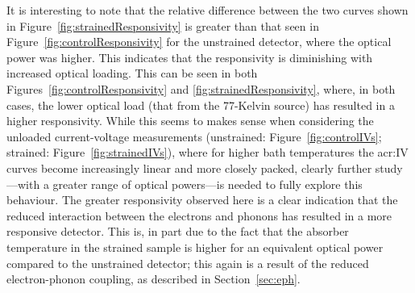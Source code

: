 \par 
It is interesting to note that the relative difference between the two curves shown in Figure~\ref{fig:strainedResponsivity} is greater than that seen in Figure~\ref{fig:controlResponsivity} for the unstrained detector, where the optical power was higher. This indicates that the responsivity is diminishing with increased optical loading. This can be seen in both Figures~\ref{fig:controlResponsivity} and \ref{fig:strainedResponsivity}, where, in both cases, the lower optical load (that from the 77-Kelvin source) has resulted in a higher responsivity. While this seems to makes sense when considering the unloaded current-voltage measurements (unstrained: Figure~\ref{fig:controlIVs}; strained: Figure~\ref{fig:strainedIVs}), where for higher bath temperatures the \gls{acr:IV} curves become increasingly linear and more closely packed, clearly further study---with a greater range of optical powers---is needed to fully explore this behaviour. The greater responsivity observed here is a clear indication that the reduced interaction between the electrons and phonons has resulted in a more responsive detector. This is, in part due to the fact that the absorber temperature in the strained sample is higher for an equivalent optical power compared to the unstrained detector; this again is a result of the reduced electron-phonon coupling, as described in Section~\ref{sec:eph}.
%
